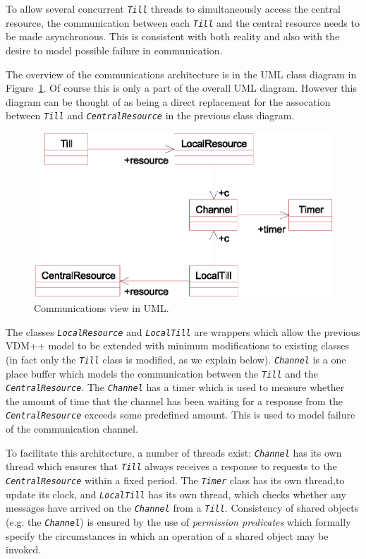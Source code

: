 \documentclass[\pformat,12pt,twoside]{article}
\begin{document}
To allow several concurrent \texttt{\emph{Till}} threads to
simultaneously access the central resource, the communication between
each \texttt{\emph{Till}} and the central resource needs to be made
asynchronous. This is consistent with both reality and also with the
desire to model possible failure in communication.

The overview of the communications architecture is in the UML class
diagram in Figure~\ref{fig:communication}. Of course this is only a
part of the overall UML diagram. However this diagram can be thought
of as being a direct replacement for the assocation between
\texttt{\emph{Till}} and
\texttt{\emph{CentralResource}} 
in the previous class diagram.

\begin{figure}[htbp]
\begin{center}
\includegraphics[width=4.487in]{communicationview2}
\caption{Communications view in UML.\label{fig:communication}}
\end{center}
\end{figure}

The classes \texttt{\emph{LocalResource}} and
\texttt{\emph{LocalTill}} are wrappers which allow the previous VDM++
model to be extended with minimum modifications to existing classes
(in fact only the \texttt{\emph{Till}} class is modified, as we
explain below). \texttt{\emph{Channel}} is a one place buffer which models the
communication between the \texttt{\emph{Till}} and the
\texttt{\emph{CentralResource}}.  The \texttt{\emph{Channel}} has a
timer which is used to measure whether the amount of time that the
channel has been waiting for a response from the
\texttt{\emph{CentralResource}} exceeds some predefined amount. This
is used to model failure of the communication channel.

To facilitate this architecture, a number of threads exist:
\texttt{\emph{Channel}} has its own thread which ensures that
\texttt{\emph{Till}} always receives a response to requests to the
\texttt{\emph{CentralResource}} within a fixed period.  The
\texttt{\emph{Timer}} class has its own thread,to update its clock,
and \texttt{\emph{LocalTill}} has its own thread, which checks whether
any messages have arrived on the \texttt{\emph{Channel}} from a
\texttt{\emph{Till}}. Consistency of shared objects (e.g.  the
\texttt{\emph{Channel}}) is ensured by the use of \textit{permission
predicates} which formally specify the circumstances in which an operation 
of a shared object may be invoked.
\end{document}
